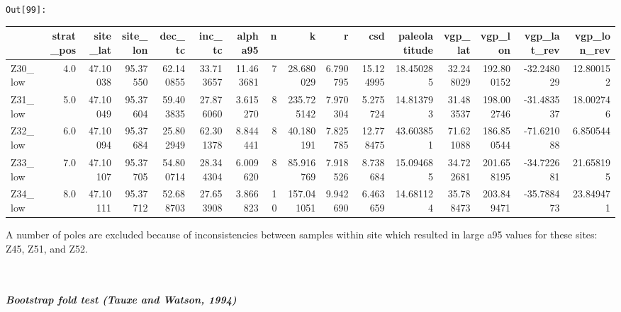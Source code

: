 \documentclass[11pt]{article}
\begin{document}
\texttt{\color{outcolor}Out[{\color{outcolor}99}]:}
    
    \begin{sidewaystable}
    {\tiny\begin{tabular}{lrrrrrrrrrrrrrrr}
\toprule
{} &  strat\_pos &  site\_lat &  site\_lon &     dec\_tc &     inc\_tc &    alpha95 &   n &           k &         r &        csd &  paleolatitude &    vgp\_lat &     vgp\_lon &  vgp\_lat\_rev &  vgp\_lon\_rev \\
\midrule
Z30\_low &        4.0 &  47.10038 &  95.37550 &  62.140855 &  33.713657 &  11.463681 &   7 &   28.680029 &  6.790795 &  15.124995 &      18.450285 &  32.248029 &  192.800152 &   -32.248029 &    12.800152 \\
Z31\_low &        5.0 &  47.10049 &  95.37604 &  59.403835 &  27.876060 &   3.615270 &   8 &  235.725142 &  7.970304 &   5.275724 &      14.813793 &  31.483537 &  198.002746 &   -31.483537 &    18.002746 \\
Z32\_low &        6.0 &  47.10094 &  95.37684 &  25.802949 &  62.301378 &   8.844441 &   8 &   40.180191 &  7.825785 &  12.778475 &      43.603851 &  71.621088 &  186.850544 &   -71.621088 &     6.850544 \\
Z33\_low &        7.0 &  47.10107 &  95.37705 &  54.800714 &  28.344304 &   6.009620 &   8 &   85.916769 &  7.918526 &   8.738684 &      15.094685 &  34.722681 &  201.658195 &   -34.722681 &    21.658195 \\
Z34\_low &        8.0 &  47.10111 &  95.37712 &  52.688703 &  27.653908 &   3.866823 &  10 &  157.041051 &  9.942690 &   6.463659 &      14.681124 &  35.788473 &  203.849471 &   -35.788473 &    23.849471 \\
\bottomrule
\end{tabular}}
\end{sidewaystable}
    

    A number of poles are excluded because of inconsistencies between
samples within site which resulted in large a95 values for these sites:
Z45, Z51, and Z52.



    \begin{center}
    \end{center}
    { \hspace*{\fill} \\}
    
    \subparagraph{Bootstrap fold test (Tauxe and Watson,
1994)}\label{bootstrap-fold-test-tauxe-and-watson-1994}
\end{document}
